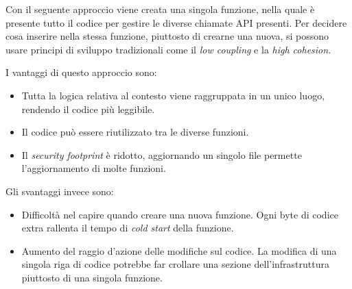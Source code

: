 Con il seguente approccio viene creata una singola funzione, nella quale è presente tutto il codice per gestire le diverse chiamate API presenti. Per decidere cosa inserire nella stessa funzione, piuttosto di crearne una nuova, si possono usare principi di sviluppo tradizionali come il \textit{low coupling} e la \textit{high cohesion}.

I vantaggi di questo approccio sono:
\begin{itemize}
    \item Tutta la logica relativa al contesto viene raggruppata in un unico luogo, rendendo il codice più leggibile.
    \item Il codice può essere riutilizzato tra le diverse funzioni.
    \item Il \textit{security footprint} è ridotto, aggiornando un singolo file permette l'aggiornamento di molte funzioni.
\end{itemize}

\vspace*{40pt}
Gli svantaggi invece sono:
\begin{itemize}
    \item Difficoltà nel capire quando creare una nuova funzione. Ogni byte di codice extra rallenta il tempo di \textit{cold start} della funzione.
    \item Aumento del raggio d'azione delle modifiche sul codice. La modifica di una singola riga di codice potrebbe far crollare una sezione dell'infrastruttura piuttosto di una singola funzione.
\end{itemize}